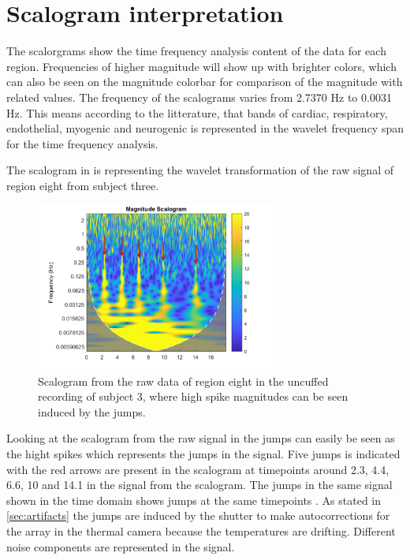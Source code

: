 \section{Scalogram interpretation}

The scalorgrams show the time frequency analysis content of the data for each region. Frequencies of higher magnitude will show up with brighter colors, which can also be seen on the magnitude colorbar for comparison of the magnitude with related values.
The frequency of the scalograms varies from 2.7370 Hz to 0.0031 Hz. This means according to the litterature, that bands of cardiac, respiratory, endothelial, myogenic and neurogenic is represented in the wavelet frequency span for the time frequency analysis. \cite{grayer2004}

The scalogram in  is representing the wavelet transformation of the raw signal of region eight from subject three.

\begin{figure}[H]
	\includegraphics[width=0.7\textwidth]{figures/uncuffed_sub3_roi8_uncorr}
	\caption{Scalogram from the raw data of region eight in the uncuffed recording of subject 3, where high spike magnitudes can be seen induced by the jumps.}
	\label{fig:scalogram_uncorr}
\end{figure}

Looking at the scalogram from the raw signal in  the jumps can easily be seen as the hight spikes which represents the jumps in the signal. Five jumps is indicated with the red arrows are present in the scalogram at timepoints around 2.3, 4.4, 6.6, 10 and 14.1 in the signal from the scalogram. The jumps in the same signal shown in the time domain shows jumps at the same timepoints  . As stated in \ref{sec:artifacts} the jumps are induced by the shutter to make autocorrections for the array in the thermal camera because the temperatures are drifting. Different noise components are represented in the signal. 

